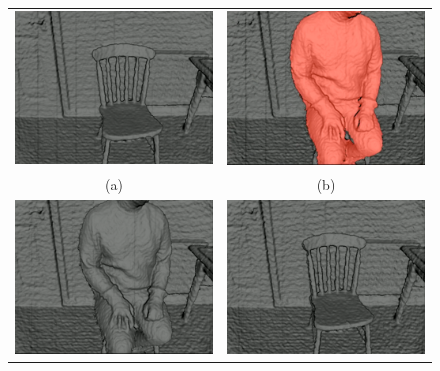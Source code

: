 \begin{figure}[!htbp]
  \centering
  \begin{tabular}{cc}
    \includegraphics[height=.4\linewidth]{figures/moseg/chair0.png} &
    \includegraphics[height=.4\linewidth]{figures/moseg/chair1.png} \\
    (a) & (b) \\
    \includegraphics[height=.4\linewidth]{figures/moseg/chair2.png} &
    \includegraphics[height=.4\linewidth]{figures/moseg/chair3.png} \\

\end{tabular}
\end{figure}
